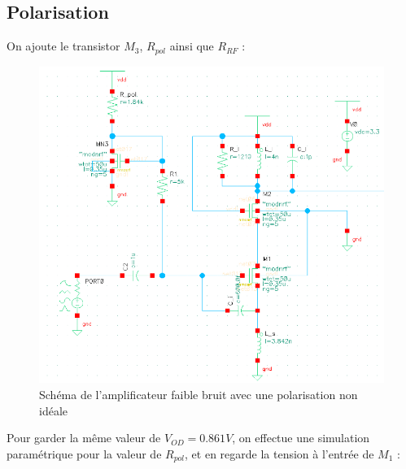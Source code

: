 \documentclass[a4paper]{article}
\begin{document}
\clearpage

\subsection{Polarisation}

On ajoute le transistor $M_3$, $R_{pol}$ ainsi que $R_{RF}$ :

\begin{figure}[!htb]
\begin{center}
  \includegraphics[scale=0.35]{schema-polarization.png}
  \caption{Sch\'ema de l'amplificateur faible bruit avec une polarisation non id\'eale}
  \label{schema-pol}
\end{center}
\end{figure}

Pour garder la m\^eme valeur de $V_{OD} = 0.861V$, on effectue une simulation param\'etrique
pour la valeur de $R_{pol}$, et en regarde la tension \`a l'entr\'ee de $M_{1}$  :
\end{document}
